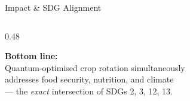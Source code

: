 \documentclass[aspectratio=169,10pt]{beamer}
\begin{document}
\begin{frame}{Impact \& SDG Alignment}
\begin{columns}[T]
\begin{column}{0.48\textwidth}
            \vspace{0.3cm}
            \begin{resultbox}
                \centering\scriptsize
                \textbf{Bottom line:}\\
                Quantum-optimised crop rotation simultaneously\\
                addresses food security, nutrition, and climate\\
                --- the \emph{exact} intersection of SDGs 2, 3, 12, 13.
            \end{resultbox}
        \end{column}
    \end{columns}
\end{frame}

\end{document}
